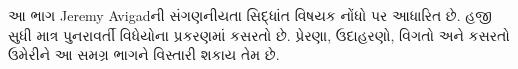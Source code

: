 \documentclass[../../include/open-logic-part]{subfiles}
\begin{document}

\begin{editorial}
  આ ભાગ Jeremy Avigadની સંગણનીયતા સિદ્ધાંત વિષયક નોંધો પર આધારિત છે.
  હજી સુધી માત્ર પુનરાવર્તી વિધેયોના પ્રકરણમાં કસરતો છે. પ્રેરણા,
  ઉદાહરણો, વિગતો અને કસરતો ઉમેરીને આ સમગ્ર ભાગને વિસ્તારી શકાય તેમ છે.
\end{editorial}



\OLEndPartHook
\end{document}
